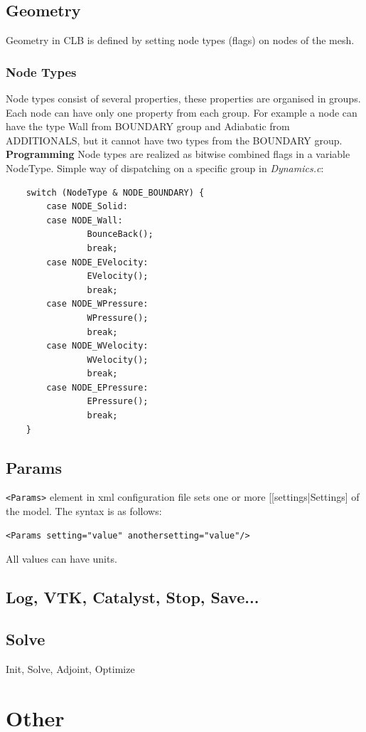 \documentclass[12pt,a4paper]{report}
\begin{document}
\subsection{Geometry}
Geometry in CLB is defined by setting node types (flags) on nodes of the mesh.
\subsubsection{Node Types}
Node types consist of several properties, these properties are organised in groups. Each node can have only one property from each group. For example a node can have the type Wall from BOUNDARY group and Adiabatic from ADDITIONALS, but it cannot have two types from the BOUNDARY group. \\
\textbf{Programming}
Node types are realized as bitwise combined flags in a variable NodeType. Simple way of dispatching on a specific group in \textit{Dynamics.c}:
\begin{lstlisting}
    switch (NodeType & NODE_BOUNDARY) {
        case NODE_Solid:
        case NODE_Wall:
                BounceBack();
                break;
        case NODE_EVelocity:
                EVelocity();
                break;
        case NODE_WPressure:
                WPressure();
                break;
        case NODE_WVelocity:
                WVelocity();
                break;
        case NODE_EPressure:
                EPressure();
                break;
    }
\end{lstlisting}
\subsection{Params}
\lstinline$<Params>$ element in xml configuration file sets one or more [[settings|Settings] of the model. The syntax is as follows:
\begin{lstlisting}
<Params setting="value" anothersetting="value"/>
\end{lstlisting}
All values can have units.
\subsection{Log, VTK, Catalyst, Stop, Save...}

\subsection{Solve}
Init, Solve, Adjoint, Optimize
\section{Other}
\end{document}
